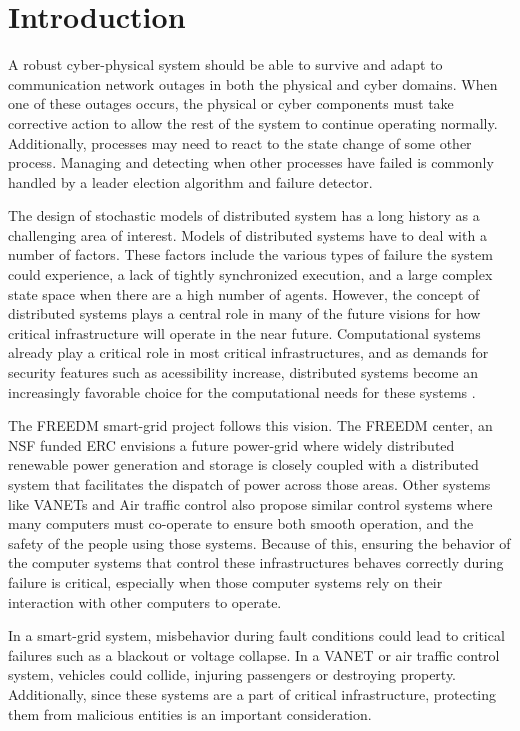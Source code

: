 \chapter{Introduction}
A robust cyber-physical system should be able to survive and adapt to communication network outages in both the physical and cyber domains.
When one of these outages occurs, the physical or cyber components must take corrective action to allow the rest of the system to continue operating normally.
Additionally, processes may need to react to the state change of some other process.
Managing and detecting when other processes have failed is commonly handled by a leader election algorithm and failure detector.

The design of stochastic models of distributed system has a long history as a challenging area of interest. Models of distributed systems have to deal with a number of factors. These factors include the various types of failure the system could experience, a lack of tightly synchronized execution, and a large complex state space when there are a high number of agents\cite{DISTRIBUTED}\cite{distributed-challenges}.  However, the concept of distributed systems plays a central role in many of the future visions for how critical infrastructure will operate in the near future. Computational systems already play a critical role in most critical infrastructures, and as demands for security features such as acessibility increase, distributed systems become an increasingly favorable choice for the computational needs for these systems \cite{SMARTGRIDBENEFITS}.

The \ac{FREEDM}\cite{FREEDM} smart-grid project follows this vision. The \ac{FREEDM} center, an NSF funded ERC envisions a future power-grid where widely distributed renewable power generation and storage is closely coupled with a distributed system that facilitates the dispatch of power across those areas. Other systems like \ac{VANET}s\cite{CARS1}\cite{CARS2} and Air traffic control \cite{AIRTRAFFIC1}\cite{AIRTRAFFIC2} also propose similar control systems where many computers must co-operate to ensure both smooth operation, and the safety of the people using those systems. Because of this, ensuring the behavior of the computer systems that control these infrastructures behaves correctly during failure is critical, especially when those computer systems rely on their interaction with other computers to operate.

In a smart-grid system, misbehavior during fault conditions could lead to critical failures such as a blackout or voltage collapse. In a \ac{VANET} or air traffic control system, vehicles could collide, injuring passengers or destroying property. Additionally, since these systems are a part of critical infrastructure, protecting them from malicious entities is an important consideration.

